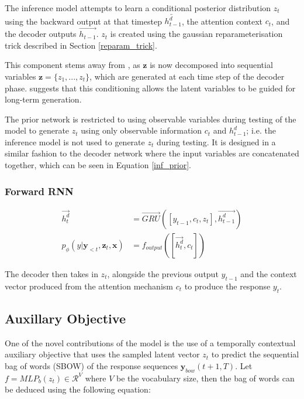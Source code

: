 \documentclass[12pt,twoside]{report}
\begin{document}
The inference model attempts to learn a conditional posterior distribution $z_t$ using the backward output at that timestep $\overleftarrow{h^d_{t-1}}$, the attention context $c_t$, and the decoder outputs $\overrightarrow{h_{t-1}}$. $z_t$ is created using the gaussian reparameterisation trick described in Section \ref{reparam_trick}.

This component stems away from \cite{zhao_learning_2017}, as $\boldsymbol{z}$ is now decomposed into sequential variables $\boldsymbol{z} = \{z_1,...,z_t\}$, which are generated at each time step of the decoder phase.  \cite{du_variational_2018} suggests that this conditioning allows the latent variables to be guided for long-term generation.

The prior network is restricted to using observable variables during testing of the model to generate $z_t$ using only observable information $c_t$ and $h^d_{t-1}$; i.e. the inference model is not used to generate $z_t$ during testing. It is designed in a similar fashion to the decoder network where the input variables are concatenated together, which can be seen in Equation \ref{inf_prior}. 

\subsubsection{Forward RNN}


\begin{equation}
	\begin{split}
		\overrightarrow{h^d_t} &= \overrightarrow{GRU}([y_{t-1},c_t,z_t], \overrightarrow{h^d_{t-1}}) \\
		p_\phi(y|\boldsymbol{y}_{<t},\boldsymbol{z}_t, \boldsymbol{x}) &= f_{output}([\overrightarrow{h^d_t}, c_t])
	\end{split}
\end{equation}

The decoder then takes in $z_t$, alongside the previous output $y_{t-1}$ and the context vector produced from the attention mechanism $c_t$ to produce the response $y_t$.

\subsection{Auxillary Objective}
\label{aux_obj}
One of the novel contributions of the model is the use of a temporally contextual auxiliary objective that uses the sampled latent vector $z_t$ to predict the sequential bag of words (SBOW) of the response sequences $\boldsymbol{y}_{bow}(t+1,T)$. Let $f=MLP_b(z_t) \in \mathcal{R}^V$ where $V$ be the vocabulary size, then the bag of words can be deduced using the following equation:
\end{document}

